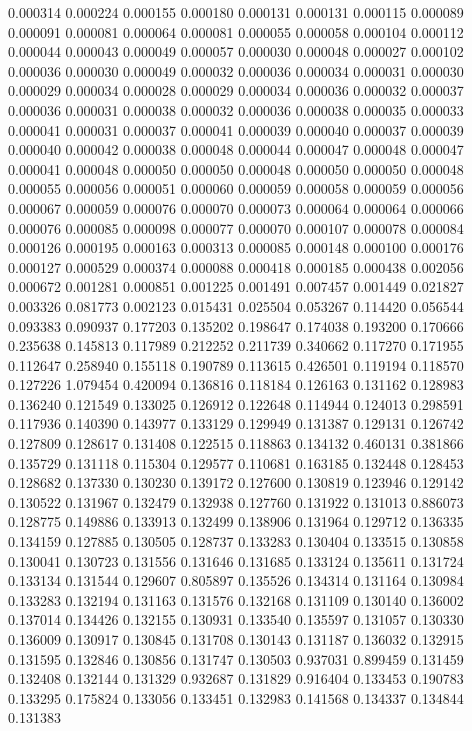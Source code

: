 0.000314
0.000224
0.000155
0.000180
0.000131
0.000131
0.000115
0.000089
0.000091
0.000081
0.000064
0.000081
0.000055
0.000058
0.000104
0.000112
0.000044
0.000043
0.000049
0.000057
0.000030
0.000048
0.000027
0.000102
0.000036
0.000030
0.000049
0.000032
0.000036
0.000034
0.000031
0.000030
0.000029
0.000034
0.000028
0.000029
0.000034
0.000036
0.000032
0.000037
0.000036
0.000031
0.000038
0.000032
0.000036
0.000038
0.000035
0.000033
0.000041
0.000031
0.000037
0.000041
0.000039
0.000040
0.000037
0.000039
0.000040
0.000042
0.000038
0.000048
0.000044
0.000047
0.000048
0.000047
0.000041
0.000048
0.000050
0.000050
0.000048
0.000050
0.000050
0.000048
0.000055
0.000056
0.000051
0.000060
0.000059
0.000058
0.000059
0.000056
0.000067
0.000059
0.000076
0.000070
0.000073
0.000064
0.000064
0.000066
0.000076
0.000085
0.000098
0.000077
0.000070
0.000107
0.000078
0.000084
0.000126
0.000195
0.000163
0.000313
0.000085
0.000148
0.000100
0.000176
0.000127
0.000529
0.000374
0.000088
0.000418
0.000185
0.000438
0.002056
0.000672
0.001281
0.000851
0.001225
0.001491
0.007457
0.001449
0.021827
0.003326
0.081773
0.002123
0.015431
0.025504
0.053267
0.114420
0.056544
0.093383
0.090937
0.177203
0.135202
0.198647
0.174038
0.193200
0.170666
0.235638
0.145813
0.117989
0.212252
0.211739
0.340662
0.117270
0.171955
0.112647
0.258940
0.155118
0.190789
0.113615
0.426501
0.119194
0.118570
0.127226
1.079454
0.420094
0.136816
0.118184
0.126163
0.131162
0.128983
0.136240
0.121549
0.133025
0.126912
0.122648
0.114944
0.124013
0.298591
0.117936
0.140390
0.143977
0.133129
0.129949
0.131387
0.129131
0.126742
0.127809
0.128617
0.131408
0.122515
0.118863
0.134132
0.460131
0.381866
0.135729
0.131118
0.115304
0.129577
0.110681
0.163185
0.132448
0.128453
0.128682
0.137330
0.130230
0.139172
0.127600
0.130819
0.123946
0.129142
0.130522
0.131967
0.132479
0.132938
0.127760
0.131922
0.131013
0.886073
0.128775
0.149886
0.133913
0.132499
0.138906
0.131964
0.129712
0.136335
0.134159
0.127885
0.130505
0.128737
0.133283
0.130404
0.133515
0.130858
0.130041
0.130723
0.131556
0.131646
0.131685
0.133124
0.135611
0.131724
0.133134
0.131544
0.129607
0.805897
0.135526
0.134314
0.131164
0.130984
0.133283
0.132194
0.131163
0.131576
0.132168
0.131109
0.130140
0.136002
0.137014
0.134426
0.132155
0.130931
0.133540
0.135597
0.131057
0.130330
0.136009
0.130917
0.130845
0.131708
0.130143
0.131187
0.136032
0.132915
0.131595
0.132846
0.130856
0.131747
0.130503
0.937031
0.899459
0.131459
0.132408
0.132144
0.131329
0.932687
0.131829
0.916404
0.133453
0.190783
0.133295
0.175824
0.133056
0.133451
0.132983
0.141568
0.134337
0.134844
0.131383
